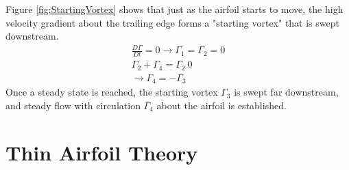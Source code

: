 \documentclass[draft=false, titlepage]{article}
\begin{document}
Figure \ref{fig:StartingVortex} shows that just as the airfoil starts to move, the high velocity gradient about the trailing edge forms a "starting vortex" that is swept downstream.
\begin{gather*}
    \frac{D\Gamma}{Dt} = 0 \rightarrow \Gamma_1 = \Gamma_2 = 0\\
    \Gamma_2 + \Gamma_4 = \Gamma_2 \ 0\\
    \rightarrow \Gamma_4 = -\Gamma_3
\end{gather*}
Once a steady state is reached, the starting vortex $\Gamma_3$ is swept far downstream, and steady flow with circulation $\Gamma_4$ about the airfoil is established.


\section{Thin Airfoil Theory}
\end{document}
